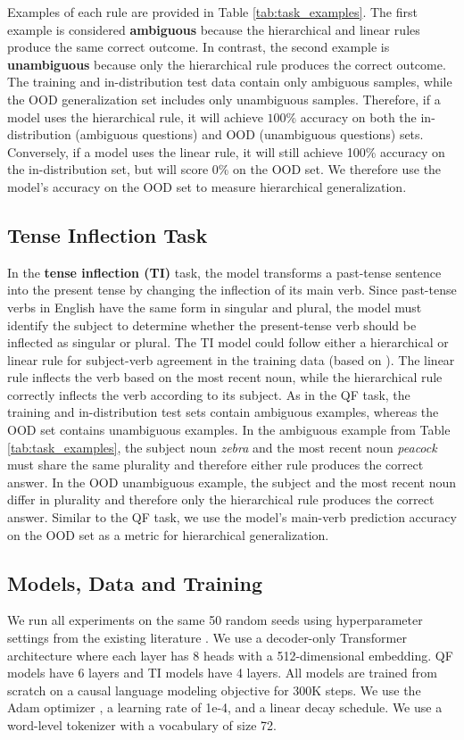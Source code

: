 Examples of each rule are provided in Table \ref{tab:task_examples}. The first example is considered \textbf{ambiguous} because the hierarchical and linear rules produce the same correct outcome. In contrast, the second example is \textbf{unambiguous} because only the hierarchical rule produces the correct outcome. The training and in-distribution test data contain only ambiguous samples, while the OOD generalization set includes only unambiguous samples. Therefore, if a model uses the hierarchical rule, it will achieve $100\%$ accuracy on both the in-distribution (ambiguous questions) and OOD (unambiguous questions) sets. Conversely, if a model uses the linear rule, it will still achieve 100\% accuracy on the in-distribution set, but will score $0\%$ on the OOD set. 
We therefore use the model's accuracy on the OOD set to measure hierarchical generalization.


\subsection{Tense Inflection Task}
\label{sec:ti_task}

In the \textbf{tense inflection (TI)} task, the model transforms a past-tense sentence into the present tense by changing the inflection of its main verb. 
Since past-tense verbs in English have the same form in singular and plural, the model must identify the subject to determine whether the present-tense verb should be inflected as singular or plural. The TI model could follow either a hierarchical or linear rule for subject-verb agreement in the training data (based on \citet{McCoy2020-pj}). The linear rule inflects the verb based on the most recent noun, while the hierarchical rule correctly inflects the verb according to its subject. As in the QF task, the training and in-distribution test sets contain ambiguous examples, whereas the OOD set contains unambiguous examples. In the ambiguous example from Table \ref{tab:task_examples}, the subject noun \textit{zebra} and the most recent noun \textit{peacock} must share the same plurality and therefore either rule produces the correct answer. In the OOD unambiguous example, the subject and the most recent noun differ in plurality and therefore only the hierarchical rule produces the correct answer.
Similar to the QF task, we use the model's main-verb prediction accuracy on the OOD set as a metric for hierarchical generalization.


\subsection{Models, Data and Training}
\label{sec:model_and_training}
We run all experiments on the same 50 random seeds using hyperparameter settings from the existing literature \citep{Ahuja2024-ul, Murty2023-xp}. We use a decoder-only Transformer architecture where each layer has 8 heads with a 512-dimensional embedding. QF models have 6 layers and TI models have 4 layers. All models are trained from scratch on a causal language modeling objective for 300K steps. We use the Adam optimizer \citep{Kingma2014-he}, a learning rate of 1e-4, and a linear decay schedule. We use a word-level tokenizer with a vocabulary of size 72. 

